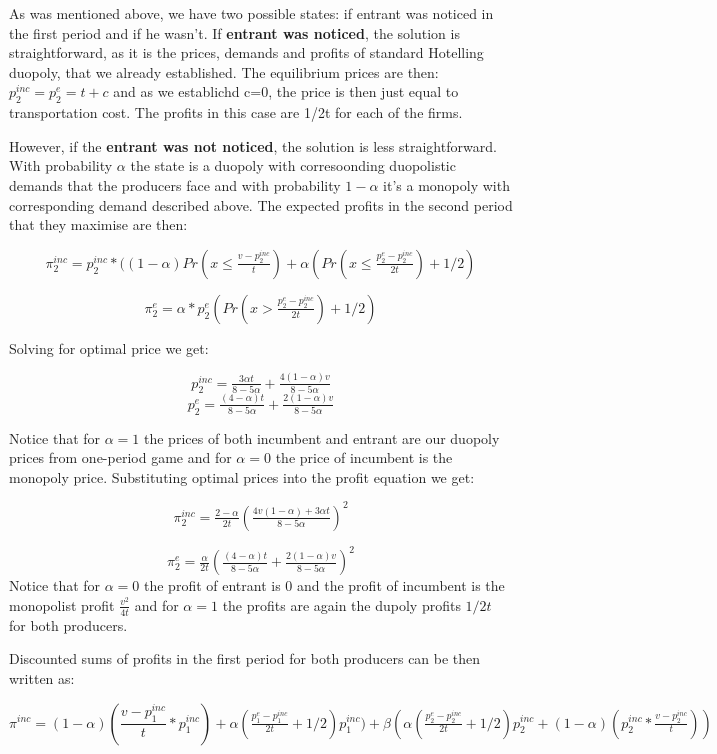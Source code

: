 \documentclass{article}
\begin{document}
As was mentioned above, we have two possible states: if entrant was noticed in the first period and if he wasn't. If \textbf{entrant was noticed}, the solution is straightforward, as it is the prices, demands and profits of standard Hotelling duopoly, that we already established. The equilibrium prices are then: $p^{inc}_2 = p^{e}_2 = t+c$ and as we establichd c=0, the price is then just equal to transportation cost. The profits in this case are 1/2t for each of the firms.

However, if the \textbf{entrant was not noticed}, the solution is less straightforward. With probability $\alpha$ the state is a duopoly with corresoonding duopolistic demands that the producers face and with probability $1- \alpha$ it's a monopoly with corresponding demand described above. 
The expected profits in the second period that they maximise are then:

$$ \pi^{inc}_2 = p_2^{inc}*((1-\alpha)Pr(x \leq \tfrac{v-p_2^{inc}}{t}) +  \alpha(Pr(x \leq \tfrac{p^{e}_2 - p^{inc}_2}{2t}) + 1/2)$$

$$ \pi^{e}_2 = \alpha *p_2^{e}(Pr(x > \tfrac{p^{e}_2 - p^{inc}_2}{2t}) + 1/2)
$$

Solving for optimal price we get:

$$
p_2^{inc} = \tfrac{3\alpha t}{8-5\alpha} + \tfrac{4(1-\alpha)v}{8-5\alpha}$$
$$
p_2^{e} = \tfrac{(4-\alpha)t}{8-5\alpha} + \tfrac{2(1-\alpha)v}{8-5\alpha}
$$

Notice that for $\alpha = 1$ the prices of both incumbent and entrant are our duopoly prices from one-period game and for $\alpha=0$ the price of incumbent is the monopoly price. 
Substituting optimal prices into the profit equation we get: 

$$ \pi^{inc}_2 = \tfrac{2-\alpha}{2t}(\tfrac{4v(1-\alpha) + 3\alpha t}{8-5\alpha})^2$$

$$ \pi^{e}_2 = \tfrac{\alpha}{2t}(\tfrac{(4-\alpha)t}{8-5\alpha} + \tfrac{2(1-\alpha)v}{8-5\alpha})^2
$$
Notice that for $\alpha=0$ the profit of entrant is 0 and the profit of incumbent is the monopolist profit $\tfrac{v^2}{4t}$ and for $\alpha=1$ the profits are again the dupoly profits $1/2t$ for both producers.

Discounted sums of profits in the first period for both producers can be then written as:

 $$ \pi^{inc} = (1-\alpha)(\frac{v-p_1^{inc}}{t}*p_1^{inc}) +  \alpha(\tfrac{p^{e}_1 - p^{inc}_1}{2t} + 1/2)p^{inc}_1) + \beta(\alpha(\tfrac{p^{e}_2 - p^{inc}_2}{2t} + 1/2)p^{inc}_2 +(1-\alpha)(p_2^{inc}*\tfrac{v-p_2^{inc}}{t}))  $$
   
\end{document}
